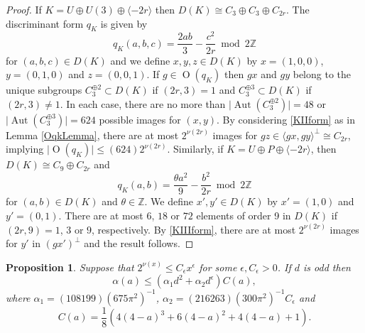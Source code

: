 \documentclass[12pt, a4paper]{article}
\newtheorem{proposition}[thm]{Proposition}
\newcommand{\ZZ}{\mathbb{Z}}
\newcommand{\la}{\langle}
\newcommand{\ra}{\rangle}
\newcommand{\opn}{\operatorname}
\newcommand{\op}{\oplus}
\begin{document}
\begin{proof}
  If $K = U \op U(3) \op \la -2r \ra$ then $D(K) \cong C_3 \op C_3 \op C_{2r}$.
  The discriminant form $q_K$ is given by 
  \begin{equation}\label{KIIform}
  q_K(a,b,c) = \frac{2ab}{3} - \frac{c^2}{2r} \bmod{ 2 \ZZ}
  \end{equation}
  for $(a,b,c) \in D(K)$ and we define $x,y,z \in D(K)$ by $x=(1,0,0)$, $y=(0,1,0)$ and $z=(0,0,1)$.
If $g \in \opn{O}(q_K)$ then $gx$ and $gy$ belong to the  unique subgroups $C_3^{\op 2} \subset D(K)$  if $(2r,3)=1$ and  $C_3^{\op 3} \subset D(K)$ if $(2r, 3) \neq 1$.
  In each case, there are no more than $\vert \opn{Aut}(C_3^{\op 2}) \vert = 48$ or $\vert \opn{Aut}(C_3^{\op 3}) \vert = 624$ possible images for $(x,y)$.
  By considering \eqref{KIIform} as in Lemma \ref{OqkLemma}, there are at most $2^{\nu(2r)}$ images for $gz \in \la gx, gy \ra^{\perp} \cong C_{2r}$, implying $\vert \opn{O}(q_K) \vert \leq (624)2^{\nu(2r)}$.
Similarly, if $K = U \op P \op \la -2r \ra$, then  $D(K) \cong C_9 \op C_{2r}$ and 
  \begin{equation}\label{KIIIform}
  q_K(a,b) = \frac{\theta a^2}{9} - \frac{b^2}{2r} \bmod{ 2\ZZ}
  \end{equation}
  for $(a,b) \in D(K)$ and $\theta \in \ZZ$. 
  We define $x',y' \in D(K)$ by $x'=(1,0)$ and $y'=(0,1)$. 
  There are at most $6$, $18$ or $72$ elements of order 9 in $D(K)$ if $(2r,9)=1$, $3$ or $9$, respectively.
  By \eqref{KIIIform}, there are at most $2^{\nu(2r)}$ images for $y'$ in $(gx')^{\perp}$ and the result follows.
\end{proof}
\begin{proposition}\label{alphabound}
  Suppose that $2^{\nu(x)} \leq C_{\epsilon} x^{\epsilon}$ for some $\epsilon, C_{\epsilon}>0$.
  If $d$ is odd then 
  \[
  \alpha(a)
  \leq
  ( \alpha_1 d^2 +  \alpha_2 d^{\epsilon} ) C(a), 
  \]
  where
  $\alpha_1 = (108199)(675 \pi^2)^{-1}$,
  $\alpha_2 = (216263)(300 \pi^2)^{-1}C_{\epsilon}$
  and
  \begin{equation}\label{C(a)}
C(a) = \frac{1}{8}(4(4-a)^3 + 6(4-a)^2 + 4(4-a) + 1).
  \end{equation}
  \end{proposition}
\end{document}
